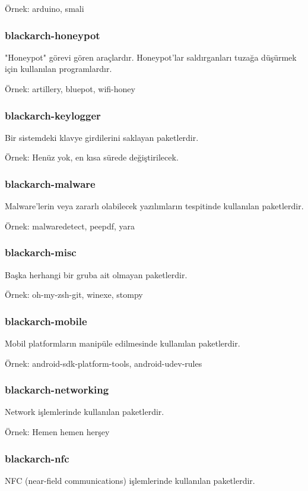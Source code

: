 \documentclass[a4paper, oneside, 11pt]{book}
\begin{document}
Örnek: arduino, smali

\subsubsection{blackarch-honeypot}
"Honeypot" görevi gören araçlardır. Honeypot'lar saldırganları tuzağa düşürmek için kullanılan programlardır.

Örnek: artillery, bluepot, wifi-honey

\subsubsection{blackarch-keylogger}
Bir sistemdeki klavye girdilerini saklayan paketlerdir.

Örnek: Henüz yok, en kısa sürede değiştirilecek.

\subsubsection{blackarch-malware}
Malware'lerin veya zararlı olabilecek yazılımların tespitinde kullanılan paketlerdir.

Örnek: malwaredetect, peepdf, yara

\subsubsection{blackarch-misc}
Başka herhangi bir gruba ait olmayan paketlerdir.

Örnek: oh-my-zsh-git, winexe, stompy

\subsubsection{blackarch-mobile}
Mobil platformların manipüle edilmesinde kullanılan paketlerdir.

Örnek: android-sdk-platform-tools, android-udev-rules

\subsubsection{blackarch-networking}
Network işlemlerinde kullanılan paketlerdir.

Örnek: Hemen hemen herşey

\subsubsection{blackarch-nfc}
NFC (near-field communications) işlemlerinde kullanılan paketlerdir.
\end{document}
